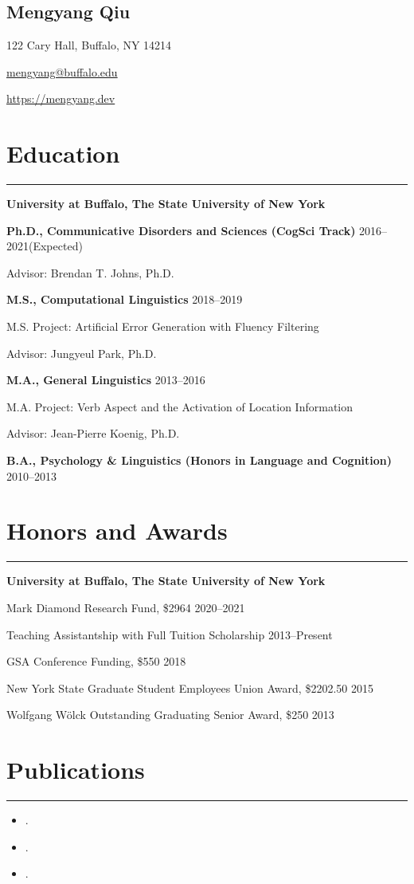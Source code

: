 \documentclass[11pt]{article}
\newcommand{\name}[1]{\begin{center}\section*{\Huge #1}\end{center}}
\newcommand{\topinfo}[1]{\begin{center}\vspace{-0.2cm}#1\vspace{-0.2cm}\end{center}}
\newcommand{\cvsection}[1]{\vspace{-0.2cm}\section*{\Large #1}\vspace{-0.2cm}\hrule\vspace{0.2cm}}
\begin{document}
\name{Mengyang Qiu}
\topinfo{122 Cary Hall, Buffalo, NY 14214}
\topinfo{\href{mailto:mengyang@buffalo.edu}{mengyang@buffalo.edu}}
\topinfo{\url{https://mengyang.dev}}


\cvsection{Education}

\textbf{University at Buffalo, The State University of New York}

\textbf{Ph.D., Communicative Disorders and Sciences (CogSci Track)} \hfill 2016--2021(Expected)

\quad Advisor: Brendan T. Johns, Ph.D.

\textbf{M.S., Computational Linguistics} \hfill 2018--2019

\quad M.S. Project: Artificial Error Generation with Fluency Filtering

\quad Advisor: Jungyeul Park, Ph.D.

\textbf{M.A., General Linguistics} \hfill 2013--2016

\quad M.A. Project: Verb Aspect and the Activation of Location Information

\quad Advisor: Jean-Pierre Koenig, Ph.D.

\textbf{B.A., Psychology \& Linguistics (Honors in Language and Cognition)} \hfill 2010--2013


\cvsection{Honors and Awards}

\textbf{University at Buffalo, The State University of New York}

Mark Diamond Research Fund, \$2964 \hfill 2020--2021

Teaching Assistantship with Full Tuition Scholarship \hfill 2013--Present

GSA Conference Funding, \$550 \hfill 2018

New York State Graduate Student Employees Union Award, \$2202.50 \hfill 2015

Wolfgang W{\"o}lck Outstanding Graduating Senior Award, \$250 \hfill 2013


\cvsection{Publications}

\begin{itemize}[leftmargin=!,labelindent=!,itemindent=-15pt]
    \setlength\itemsep{0.3em}

    \item[] .
    \item[] .
    \item[] .

\end{itemize}
\end{document}
